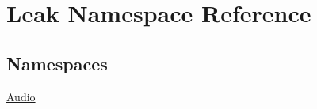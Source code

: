 \hypertarget{namespace_leak}{}\section{Leak Namespace Reference}
\label{namespace_leak}
\subsection*{Namespaces}
\begin{DoxyCompactItemize}
\item 
 \hyperlink{namespace_leak_1_1_audio}{Audio}
\end{DoxyCompactItemize}
